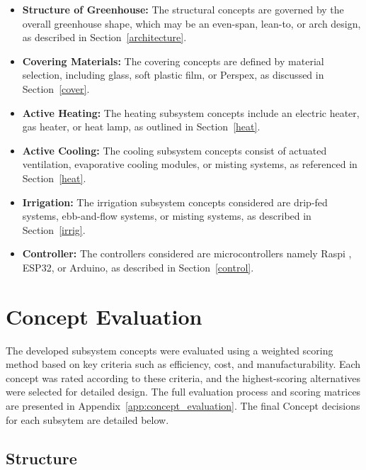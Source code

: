 \begin{itemize}
	\item \textbf{Structure of Greenhouse:}  
	The structural concepts are governed by the overall greenhouse shape, which may be an even-span, lean-to, or arch design, as described in Section~\ref{architecture}.
	
	\item \textbf{Covering Materials:}  
	The covering concepts are defined by material selection, including glass, soft plastic film, or Perspex, as discussed in Section~\ref{cover}.
	
	\item \textbf{Active Heating:}  
	The heating subsystem concepts include an electric heater, gas heater, or heat lamp, as outlined in Section~\ref{heat}.
	
	\item \textbf{Active Cooling:}  
	The cooling subsystem concepts consist of actuated ventilation, evaporative cooling modules, or misting systems, as referenced in Section~\ref{heat}.
	
	\item \textbf{Irrigation:}  
	The irrigation subsystem concepts considered are drip-fed systems, ebb-and-flow systems, or misting systems, as described in Section~\ref{irrig}.
	
	\item \textbf{Controller:}  
	The controllers considered are microcontrollers namely Raspi , ESP32, or Arduino, as described in Section~\ref{control}.
\end{itemize}


\section{Concept Evaluation}

The developed subsystem concepts were evaluated using a weighted scoring method based on key criteria such as efficiency, cost, and manufacturability. Each concept was rated according to these criteria, and the highest-scoring alternatives were selected for detailed design. The full evaluation process and scoring matrices are presented in Appendix~\ref{app:concept_evaluation}. The final Concept decisions for each subsytem are detailed below.

\subsection{Structure}

